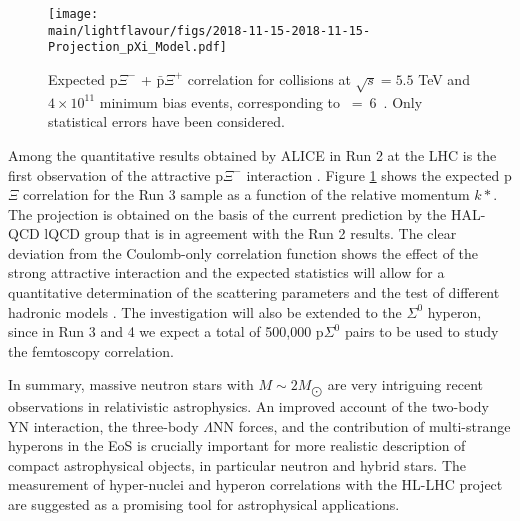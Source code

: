 \begin{figure}
\centering
\texttt{[image: \\main/lightflavour/figs/2018-11-15-2018-11-15-Projection\_pXi\_Model.pdf]}
\caption{Expected p$\Xi^-$ + $\bar{\mathrm{p}}\Xi^+$ correlation for \pp collisions at $\sqrt{s} = 5.5$ TeV and $4\times 10^{11}$ minimum bias events, corresponding to \Lint~=~6~\pbInv. Only statistical errors have been considered.}
\label{pXiProj}
\end{figure}

Among the quantitative results obtained by ALICE in Run 2 at the LHC is the first observation of the attractive p$\Xi^-$ interaction \cite{alice-femto-inprep}.  
Figure \ref{pXiProj}  
shows the expected p$\Xi$ correlation for the Run 3 \pp sample as a function of the relative momentum $k*$. 
The projection is obtained on the basis of the current prediction by the HAL-QCD lQCD group \cite{Sasaki:2017ysy,Hatsuda:2017uxk} that is in agreement with the Run 2 results.
The clear deviation from the Coulomb-only correlation function shows the effect of the strong attractive interaction 
and the expected statistics will allow for a quantitative determination of the scattering parameters and the test of different hadronic models \cite{Haidenbauer:2018jvl,Rijken:2006kg}.
The investigation will also be extended to the $\Sigma^0$ hyperon, since in Run 3 and 4 we expect a total of 500,000 p$\Sigma^0$ pairs to be used to study the femtoscopy correlation.

In summary, massive neutron stars with $M \sim 2M_{\bigodot}$ are very intriguing recent observations in relativistic astrophysics. 
An improved account of the two-body YN interaction, the three-body $\Lambda$NN forces, and the contribution of multi-strange hyperons in the EoS is crucially important for more realistic description of compact astrophysical objects, in particular neutron and hybrid stars. The measurement of hyper-nuclei and hyperon correlations with the HL-LHC project are suggested as a promising tool for astrophysical applications.
